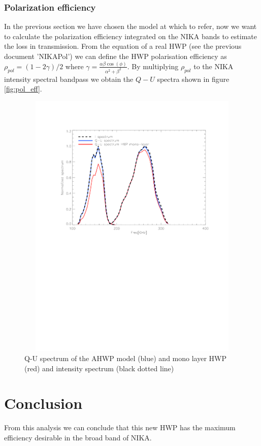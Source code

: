 \documentclass[a4paper,10pt]{article}
\begin{document}
\begin{table} [t!]
	\begin{center}
	\end{center}
	\caption{Results of the HWP parameters} \label{tab1}
\end{table}

\subsubsection{Polarization efficiency}
In the previous section we have chosen the model at which to refer, now we want to calculate the polarization efficiency integrated on the NIKA bands to estimate the loss in transmission.
From the equation of a real HWP (see the previous document 'NIKAPol') we can define the HWP polarisation efficiency as $\rho_{pol} = (1-2\gamma)/2$ where $\gamma = \frac{\alpha \beta \cos(\phi)}{\alpha^2 + \beta^2}$. By multiplying $\rho_{pol}$ to the NIKA intensity spectral bandpass we obtain the $Q-U$ spectra shown in figure \eqref{fig:pol_eff}.

\begin{figure}[!h]
	\centering
	\includegraphics[height=13cm, width=16cm, trim=0cm 8cm 0cm 2cm, clip=true]{figures/Efficiency_Pol}
	\caption{Q-U spectrum of the AHWP model (blue) and mono layer HWP (red) and intensity spectrum (black dotted line) }
	\label{fig:pol_eff}
\end{figure}
\section{Conclusion}
From this analysis we can conclude that this new HWP has the maximum efficiency desirable in the broad band of NIKA.
\end{document}
